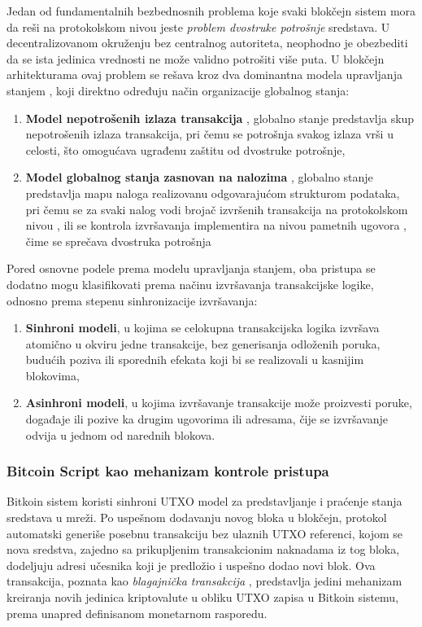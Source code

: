 Jedan od fundamentalnih bezbednosnih problema koje svaki blokčejn sistem mora da reši na protokolskom nivou jeste \textit{problem dvostruke potrošnje} sredstava. U decentralizovanom okruženju bez centralnog autoriteta, neophodno je obezbediti da se ista jedinica vrednosti ne može validno potrošiti više puta. U blokčejn arhitekturama ovaj problem se rešava kroz dva dominantna modela upravljanja stanjem , koji direktno određuju način organizacije globalnog stanja:
\begin{enumerate}
\item \textbf{Model nepotrošenih izlaza transakcija} , globalno stanje predstavlja skup nepotrošenih izlaza transakcija, pri čemu se potrošnja svakog izlaza vrši u celosti, što omogućava ugrađenu zaštitu od dvostruke potrošnje,
\item \textbf{Model globalnog stanja zasnovan na nalozima} , globalno stanje predstavlja mapu naloga realizovanu odgovarajućom strukturom podataka, pri čemu se za svaki nalog vodi brojač izvršenih transakcija na protokolskom nivou , ili se kontrola izvršavanja implementira na nivou pametnih ugovora , čime se sprečava dvostruka potrošnja
\end{enumerate}

Pored osnovne podele prema modelu upravljanja stanjem, oba pristupa se dodatno mogu klasifikovati prema načinu izvršavanja transakcijske logike, odnosno prema stepenu sinhronizacije izvršavanja:
\begin{enumerate}
\item \textbf{Sinhroni modeli}, u kojima se celokupna transakcijska logika izvršava atomično u okviru jedne transakcije, bez generisanja odloženih poruka, budućih poziva ili sporednih efekata koji bi se realizovali u kasnijim blokovima,
\item \textbf{Asinhroni modeli}, u kojima izvršavanje transakcije može proizvesti poruke, događaje ili pozive ka drugim ugovorima ili adresama, čije se izvršavanje odvija u jednom od narednih blokova.
\end{enumerate}

\subsubsection{Bitcoin Script kao mehanizam kontrole pristupa}
Bitkoin sistem koristi sinhroni UTXO model za predstavljanje i praćenje stanja sredstava u mreži. Po uspešnom dodavanju novog bloka u blokčejn, protokol automatski generiše posebnu transakciju bez ulaznih UTXO referenci, kojom se nova sredstva, zajedno sa prikupljenim transakcionim naknadama iz tog bloka, dodeljuju adresi učesnika koji je predložio i uspešno dodao novi blok. Ova transakcija, poznata kao \textit{blagajnička transakcija} , predstavlja jedini mehanizam kreiranja novih jedinica kriptovalute u obliku UTXO zapisa u Bitkoin sistemu, prema unapred definisanom monetarnom rasporedu.

